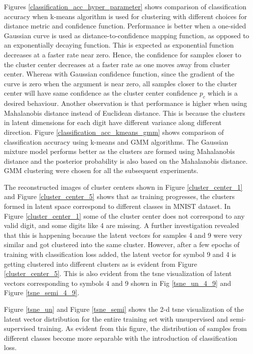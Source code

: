 \documentclass[runningheads]{llncs}
\begin{document}
Figures \ref{classification_acc_hyper_parameter} shows comparison of classification accuracy when k-means algorithm is used for clustering  with different choices for distance metric and confidence function.
Performance is better when a one-sided Gaussian curve is used as distance-to-confidence mapping function, as opposed to an exponentially decaying function.
This is expected as exponential function decreases at a faster rate near zero.
Hence, the confidence for samples closer to the cluster center decreases at a faster rate as one moves away from cluster center.
Whereas  with Gaussian confidence function, since the gradient of the curve is zero when the argument is near zero, all samples closer to the cluster center will have same confidence as the cluster center confidence $p_c$ which is a desired behaviour.
Another observation is that performance is higher when using Mahalanobis distance instead of Euclidean distance.
This is because the clusters in latent dimensions for each digit have different variance along different direction.
Figure \ref{classification_acc_kmeans_gmm} shows comparison of classification accuracy using k-means and GMM algorithms.
The Gaussian mixture model performs better as the clusters are formed using Mahalanobis distance and the posterior probability is also based on the Mahalanobis distance.
GMM clustering were chosen for all the subsequent experiments.

The reconstructed images of cluster centers shown in Figure \ref{cluster_center_1} and Figure \ref{cluster_center_5} shows that as training progresses, the clusters formed in latent space correspond to different classes in MNIST dataset.
In Figure \ref{cluster_center_1} some of the cluster center does not correspond to any valid digit, and some digits like 4  are missing.
A further investigation revealed that this is happening because the latent vectors for samples 4 and 9 were very similar and got clustered into the same cluster.
However, after a few epochs of training with classification loss added, the latent vector for symbol 9 and 4 is getting clustered into different clusters as is evident from Figure \ref{cluster_center_5}.
This is also evident from the tsne visualization of latent vectors corresponding to symbols 4 and 9  shown in Fig \ref{tsne_un_4_9} and Figure \ref{tsne_semi_4_9}.

Figure \ref{tsne_un} and Figure \ref{tsne_semi} shows the 2-d tsne visualization of the latent vector distribution for the entire training set with unsupervised and semi-supervised training.
As evident from this figure, the distribution of samples from different classes become more separable with the introduction of classification loss.
\end{document}

